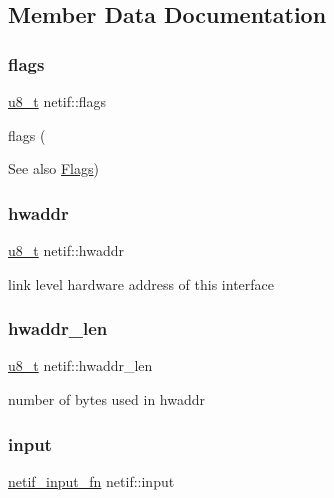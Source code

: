\subsection{Member Data Documentation}
\mbox{\label{structnetif_a1c171db6097bbb6f09f63549a66e00ea}} 
\subsubsection{\texorpdfstring{flags}{flags}}
{\footnotesize\ttfamily \hyperlink{group__compiler__abstraction_ga4caecabca98b43919dd11be1c0d4cd8e}{u8\+\_\+t} netif\+::flags}

flags (\begin{DoxySeeAlso}{See also}
\hyperlink{group__netif__flags}{Flags}) 
\end{DoxySeeAlso}
\mbox{\label{structnetif_aa6d410efeb59c69a881251a93b8abd1e}} 
\subsubsection{\texorpdfstring{hwaddr}{hwaddr}}
{\footnotesize\ttfamily \hyperlink{group__compiler__abstraction_ga4caecabca98b43919dd11be1c0d4cd8e}{u8\+\_\+t} netif\+::hwaddr}

link level hardware address of this interface \mbox{\label{structnetif_afe1181561cb16241f3cb5ed01e567d42}} 
\subsubsection{\texorpdfstring{hwaddr\+\_\+len}{hwaddr\_len}}
{\footnotesize\ttfamily \hyperlink{group__compiler__abstraction_ga4caecabca98b43919dd11be1c0d4cd8e}{u8\+\_\+t} netif\+::hwaddr\+\_\+len}

number of bytes used in hwaddr \mbox{\label{structnetif_a8fe4f1b7b0d710216287da9615164a5c}} 
\subsubsection{\texorpdfstring{input}{input}}
{\footnotesize\ttfamily \hyperlink{openmote-cc2538_2lwip_2src_2include_2lwip_2netif_8h_ab2302b1b64ac7b95f24c6bab754a575e}{netif\+\_\+input\+\_\+fn} netif\+::input}

